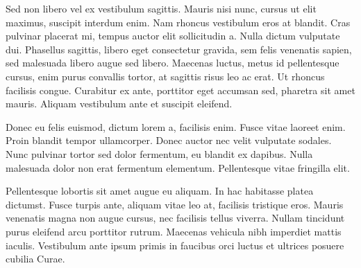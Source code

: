 Sed non libero vel ex vestibulum sagittis. Mauris nisi nunc, cursus ut elit maximus, suscipit interdum enim. Nam rhoncus vestibulum eros at blandit. Cras pulvinar placerat mi, tempus auctor elit sollicitudin a. Nulla dictum vulputate dui. Phasellus sagittis, libero eget consectetur gravida, sem felis venenatis sapien, sed malesuada libero augue sed libero. Maecenas luctus, metus id pellentesque cursus, enim purus convallis tortor, at sagittis risus leo ac erat. Ut rhoncus facilisis congue. Curabitur ex ante, porttitor eget accumsan sed, pharetra sit amet mauris. Aliquam vestibulum ante et suscipit eleifend.

Donec eu felis euismod, dictum lorem a, facilisis enim. Fusce vitae laoreet enim. Proin blandit tempor ullamcorper. Donec auctor nec velit vulputate sodales. Nunc pulvinar tortor sed dolor fermentum, eu blandit ex dapibus. Nulla malesuada dolor non erat fermentum elementum. Pellentesque vitae fringilla elit.

Pellentesque lobortis sit amet augue eu aliquam. In hac habitasse platea dictumst. Fusce turpis ante, aliquam vitae leo at, facilisis tristique eros. Mauris venenatis magna non augue cursus, nec facilisis tellus viverra. Nullam tincidunt purus eleifend arcu porttitor rutrum. Maecenas vehicula nibh imperdiet mattis iaculis. Vestibulum ante ipsum primis in faucibus orci luctus et ultrices posuere cubilia Curae.
 